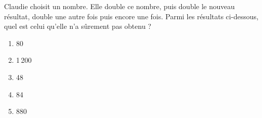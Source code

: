 Claudie choisit un nombre. Elle double ce nombre, puis double le nouveau résultat, double une autre fois puis encore une fois. Parmi les résultats ci-dessous, quel est celui qu'elle n'a sûrement pas obtenu ?
\begin{multicols}{5}
\begin{enumerate}[A/]
\item 80
\item 1\,200
\item 48
\item 84
\item 880
\end{enumerate}  
\end{multicols}
